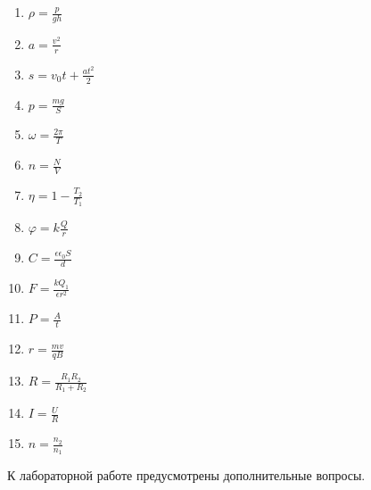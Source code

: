 \begin{enumerate}

\item $\rho =\frac{p}{gh}$

\item $a=\frac{v^2}{r}$

\item  $s=v_0t+\frac{at^2}{2}$

\item  $p=\frac{mg}{S}$

\item  $\omega =\frac{2\pi }{T}$

\item  $n=\frac{N}{V}$

\item  $\eta =1-\frac{T_2}{T_1}$

\item  $\varphi =k\frac{Q}{r}$

\item  $C=\frac{\epsilon \epsilon_0S}{d}$

\item  $F=\frac{kQ_1}{\epsilon r^2}$

\item  $P=\frac{A}{t}$

\item  $r=\frac{mv}{qB}$

\item  $R=\frac{R_1R_2}{R_1+R_2}$

\item  $I=\frac{U}{R}$

\item  $n=\frac{n_2}{n_1}$

\end{enumerate}

К лабораторной работе предусмотрены дополнительные вопросы.


